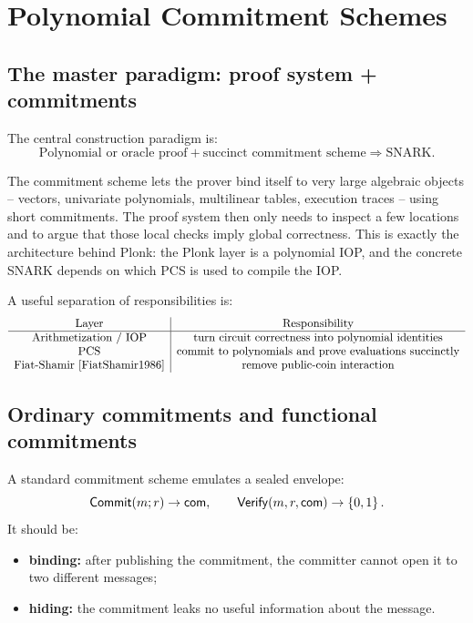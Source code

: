 ﻿\section{Polynomial Commitment Schemes}

\subsection{The master paradigm: proof system + commitments}

The central construction paradigm is:
\[
\boxed{\text{Polynomial or oracle proof} + \text{succinct commitment scheme} \Longrightarrow \text{SNARK}.}
\]

The commitment scheme lets the prover bind itself to very large algebraic objects -- vectors, univariate polynomials, multilinear tables, execution traces -- using short commitments. The proof system then only needs to inspect a few locations and to argue that those local checks imply global correctness. This is exactly the architecture behind Plonk: the Plonk layer is a polynomial IOP, and the concrete SNARK depends on which PCS is used to compile the IOP.

A useful separation of responsibilities is:
\[
\begin{array}{c|c}
\text{Layer} & \text{Responsibility}\\
\hline
\text{Arithmetization / IOP} & \text{turn circuit correctness into polynomial identities}\\
\text{PCS} & \text{commit to polynomials and prove evaluations succinctly}\\
\text{Fiat-Shamir \cite{FiatShamir1986}} & \text{remove public-coin interaction}\\
\end{array}
\]

\subsection{Ordinary commitments and functional commitments}

A standard commitment scheme emulates a sealed envelope:
\[
\mathsf{Commit}(m;r)\to \mathsf{com},\qquad \mathsf{Verify}(m,r,\mathsf{com})\to\left\{0,1\right\}.
\]
It should be:
\begin{itemize}[leftmargin=2em]
    \item \textbf{binding:} after publishing the commitment, the committer cannot open it to two different messages;
    \item \textbf{hiding:} the commitment leaks no useful information about the message.
\end{itemize}

